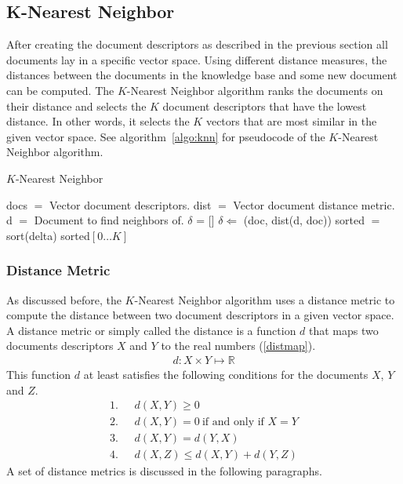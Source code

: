 \subsection{K-Nearest Neighbor}
After creating the document descriptors as described in the previous section
all documents lay in a specific vector space. Using different distance measures,
the distances between the documents in the knowledge base and some new document can be computed. The $K$-Nearest
Neighbor algorithm ranks the documents on their distance and selects the $K$ document descriptors that have the lowest
distance. In other words, it selects the $K$ vectors that are most similar in the given
vector space. See algorithm~\ref{algo:knn} for pseudocode of the $K$-Nearest
Neighbor algorithm.

\begin{algorithm}                      
  \caption{$K$-Nearest Neighbor}      
  \label{algo:knn}
  \begin{algorithmic}

    \STATE docs $=$ Vector document descriptors.
    \STATE dist $=$ Vector document distance metric.
    \STATE d $=$ Document to find neighbors of.
    \STATE $\delta$ = []
      \STATE $\delta \Leftarrow$ (doc, dist(d, doc))
    \ENDFOR
    \STATE sorted $=$ sort(delta)
    \RETURN sorted$[0\ldots K]$
  \end{algorithmic}
\end{algorithm}

\subsubsection{Distance Metric}
\label{sec:metrics}
As discussed before, the $K$-Nearest Neighbor algorithm uses a distance metric
to compute the distance between two document descriptors in a given vector
space. A distance metric or simply called the distance is a function $d$ that 
maps two documents descriptors $X$ and $Y$ to the real numbers (\ref{distmap}).
\begin{align}
  d : X \times Y \mapsto \mathbb{R} \label{distmap}
\end{align}
This function $d$ at least satisfies the following conditions for the documents
$X$, $Y$ and $Z$.
\begin{align*}
  1.\ \ \ & d(X,Y) \geq 0 \\
  2.\ \ \ & d(X,Y) = 0\  \text{if and only if $X=Y$} \\
  3.\ \ \ & d(X,Y) = d(Y,X) \\
  4.\ \ \ & d(X,Z) \leq d(X,Y) + d(Y,Z)
\end{align*}
A set of distance metrics is discussed in the following paragraphs. 

